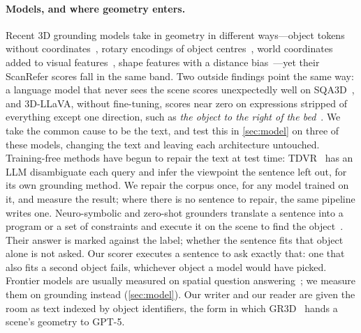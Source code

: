 \paragraph{Models, and where geometry enters.}
Recent 3D grounding models take in geometry in different ways---object tokens without coordinates~\cite{chatscene}, rotary encodings of object centres~\cite{quatrope}, world coordinates added to visual features~\cite{video3dllm,3drs}, shape features with a distance bias~\cite{3dllava}---yet their ScanRefer scores fall in the same band. Two outside findings point the same way: a language model that never sees the scene scores unexpectedly well on SQA3D~\cite{sqa3d,beacon3d}, and 3D-LLaVA, without fine-tuning, scores near zero on expressions stripped of everything except one direction, such as \emph{the object to the right of the bed}~\cite{nanri2026viewpoint}. We take the common cause to be the text, and test this in \cref{sec:model} on three of these models, changing the text and leaving each architecture untouched. Training-free methods have begun to repair the text at test time: TDVR~\cite{tdvr} has an LLM disambiguate each query and infer the viewpoint the sentence left out, for its own grounding method. We repair the corpus once, for any model trained on it, and measure the result; where there is no sentence to repair, the same pipeline writes one. Neuro-symbolic and zero-shot grounders translate a sentence into a program or a set of constraints and execute it on the scene to find the object~\cite{ns3d,zsvg3d,csvg}. Their answer is marked against the label; whether the sentence fits that object alone is not asked. Our scorer executes a sentence to ask exactly that: one that also fits a second object fails, whichever object a model would have picked. Frontier models are usually measured on spatial question answering~\cite{vqa2,vsibench}; we measure them on grounding instead (\cref{sec:model}). Our writer and our reader are given the room as text indexed by object identifiers, the form in which GR3D~\cite{gr3d_zillow} hands a scene's geometry to GPT-5.
